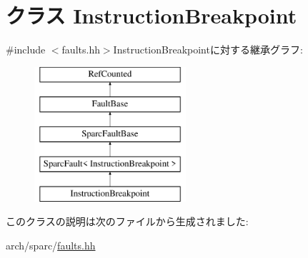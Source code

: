 \hypertarget{classSparcISA_1_1InstructionBreakpoint}{
\section{クラス InstructionBreakpoint}
\label{classSparcISA_1_1InstructionBreakpoint}
}


{\ttfamily \#include $<$faults.hh$>$}InstructionBreakpointに対する継承グラフ:\begin{figure}[H]
\begin{center}
\leavevmode
\includegraphics[height=5cm]{classSparcISA_1_1InstructionBreakpoint}
\end{center}
\end{figure}


このクラスの説明は次のファイルから生成されました:\begin{DoxyCompactItemize}
\item 
arch/sparc/\hyperlink{arch_2sparc_2faults_8hh}{faults.hh}\end{DoxyCompactItemize}
